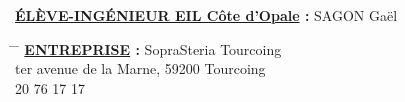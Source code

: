 \setcounter{page}{2}
\vphantom{8cm}%
\begin{center}%
%
\end{center}%
\vphantom{10pt}%
\begin{center}%
%
\end{center}%
\vphantom{10pt}%
\textbf{\underline{ÉLÈVE-INGÉNIEUR EIL Côte d'Opale} : }SAGON Gaël%

\vspace{1cm}%
\begin{tabbing}%
\hspace{0 cm}\= \hspace{5cm} \=\kill%
\>\textbf{\underline{ENTREPRISE} :} \> SopraSteria Tourcoing\\%
\>  ter avenue de la Marne, 59200 Tourcoing\\%
\>  20 76 17 17\\%
\end{tabbing}%

